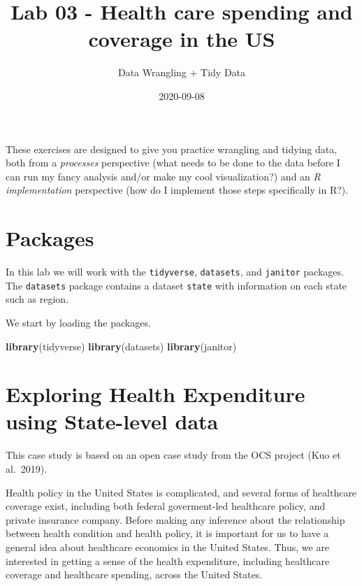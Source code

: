 \documentclass[
]{article}
\title{Lab 03 - Health care spending and coverage in the US}
\subtitle{Data Wrangling + Tidy Data}
\author{}
\date{\vspace{-2.5em}2020-09-08}
\newenvironment{Shaded}{\begin{snugshade}}{\end{snugshade}}
\newcommand{\KeywordTok}[1]{\textcolor[rgb]{0.13,0.29,0.53}{\textbf{#1}}}
\newcommand{\NormalTok}[1]{#1}
\begin{document}
\maketitle

{
\setcounter{tocdepth}{2}
\tableofcontents
}
These exercises are designed to give you practice wrangling and tidying
data, both from a \emph{processes} perspective (what needs to be done to
the data before I can run my fancy analysis and/or make my cool
visualization?) and an \emph{R implementation} perspective (how do I
implement those steps specifically in R?).

\hypertarget{packages}{%
\section{Packages}\label{packages}}

In this lab we will work with the \texttt{tidyverse}, \texttt{datasets},
and \texttt{janitor} packages. The \texttt{datasets} package contains a
dataset \texttt{state} with information on each state such as region.

We start by loading the packages.

\begin{Shaded}
\begin{Highlighting}[]
\KeywordTok{library}\NormalTok{(tidyverse)}
\KeywordTok{library}\NormalTok{(datasets)}
\KeywordTok{library}\NormalTok{(janitor)}
\end{Highlighting}
\end{Shaded}

\hypertarget{exploring-health-expenditure-using-state-level-data}{%
\section{Exploring Health Expenditure using State-level
data}\label{exploring-health-expenditure-using-state-level-data}}

This case study is based on an open case study from the OCS project (Kuo
et al.~2019).

Health policy in the United States is complicated, and several forms of
healthcare coverage exist, including both federal goverment-led
healthcare policy, and private insurance company. Before making any
inference about the relationship between health condition and health
policy, it is important for us to have a general idea about healthcare
economics in the United States. Thus, we are interested in getting a
sense of the health expenditure, including healthcare coverage and
healthcare spending, across the United States.
\end{document}
